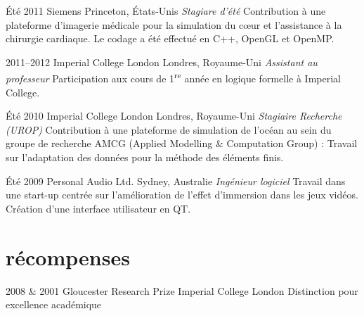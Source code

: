 \documentclass[]{friggeri-cv} %
\begin{document}
\begin{entrylist}

\entry
{Été 2011}
{Siemens}
{Princeton, États-Unis}
{\emph{Stagiare d'été}
\medbreak
Contribution à une plateforme d’imagerie médicale pour la simulation du cœur et
l’assistance à la chirurgie cardiaque. Le codage a été effectué
en C++, OpenGL et OpenMP.
\bigbreak
}

\entry
{2011--2012}
{Imperial College London}
{Londres, Royaume-Uni}
{\emph{Assistant au professeur}
\medbreak
    Participation aux cours de 1\textsuperscript{re} année en logique formelle à Imperial College.
\bigbreak
}

\entry
{Été 2010}
{Imperial College London}
{Londres, Royaume-Uni}
    {\emph{Stagiaire Recherche (UROP)}
	\medbreak
    Contribution à une plateforme de simulation de l’océan au sein du groupe
    de recherche AMCG (Applied Modelling \& Computation Group) : Travail 
    sur l'adaptation des données pour la méthode des éléments finis.
	\bigbreak
}

\entry
{Été 2009}
{Personal Audio Ltd.}
{Sydney, Australie}
    {\emph{Ingénieur logiciel}
	\medbreak
    Travail dans une start-up centrée sur l’amélioration de l’effet d'immersion dans les
    jeux vidéos. Création d’une interface utilisateur en QT.
	\bigbreak
}


\end{entrylist}


\section{récompenses}

\begin{entrylist}


\entry
{2008 \& 2001}
{Gloucester Research Prize}
{Imperial College London}
{Distinction pour excellence académique}


\end{entrylist}


\end{document}
